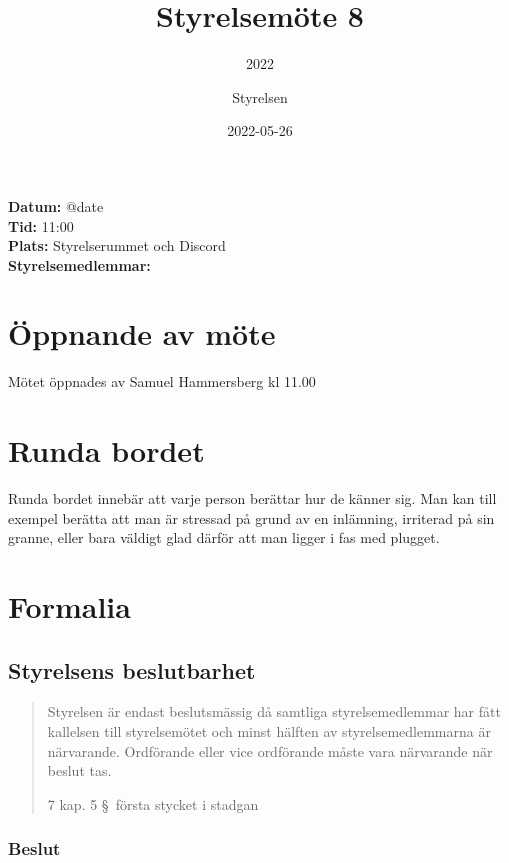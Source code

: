 \documentclass[protokoll]{dvd}
\begin{document}
\title{Styrelsemöte 8}
\subtitle{2022}
\author{Styrelsen}
\date{2022-05-26}

\textbf{Datum:} \csname @date\endcsname\\
\textbf{Tid:} 11:00\\
\textbf{Plats:} Styrelserummet och Discord\\
\textbf{Styrelsemedlemmar:}
\begin{närvarande_förtroendevalda}
\end{närvarande_förtroendevalda}


\section{Öppnande av möte}

Mötet öppnades av Samuel Hammersberg kl 11.00

\section{Runda bordet}

Runda bordet innebär att varje person berättar hur de känner sig.
Man kan till exempel berätta att man är stressad på grund av en inlämning, irriterad på sin granne, eller bara väldigt glad därför att man ligger i fas med plugget.

\section{Formalia}

\subsection{Styrelsens beslutbarhet}

\blockquote[7 kap. 5 \S~första stycket i stadgan][]{%
    Styrelsen är endast beslutsmässig då samtliga styrelsemedlemmar har fått kallelsen till styrelsemötet och minst hälften av styrelsemedlemmarna är närvarande.
    Ordförande eller vice ordförande måste vara närvarande när beslut tas.
}

\subsubsection*{Beslut}
\end{document}
